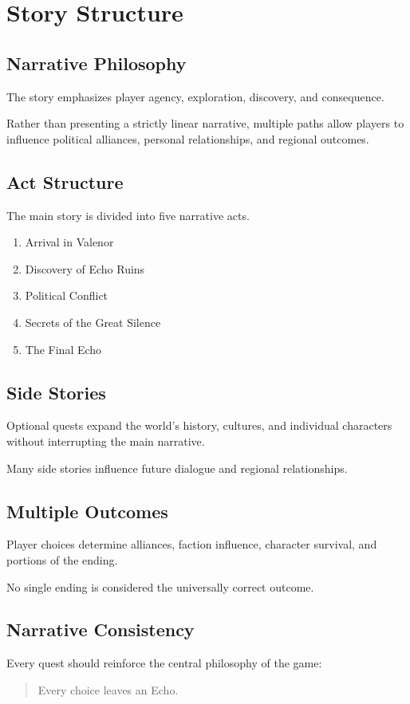 \chapter{Story Structure}

\section{Narrative Philosophy}

The story emphasizes player agency, exploration, discovery, and consequence.

Rather than presenting a strictly linear narrative, multiple paths allow players to influence political alliances, personal relationships, and regional outcomes.

\section{Act Structure}

The main story is divided into five narrative acts.

\begin{enumerate}
    \item Arrival in Valenor
    \item Discovery of Echo Ruins
    \item Political Conflict
    \item Secrets of the Great Silence
    \item The Final Echo
\end{enumerate}

\section{Side Stories}

Optional quests expand the world's history, cultures, and individual characters without interrupting the main narrative.

Many side stories influence future dialogue and regional relationships.

\section{Multiple Outcomes}

Player choices determine alliances, faction influence, character survival, and portions of the ending.

No single ending is considered the universally correct outcome.

\section{Narrative Consistency}

Every quest should reinforce the central philosophy of the game:

\begin{quote}
Every choice leaves an Echo.
\end{quote}